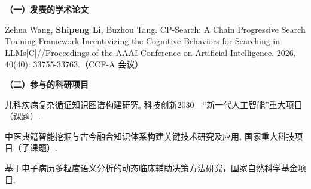 
\begin{publication}
  \noindent\songti\textbf{（一）发表的学术论文}
  \begin{publist}
    \item Zehua Wang, \textbf{Shipeng Li}, Buzhou Tang. CP-Search: A Chain Progressive Search Training Framework Incentivizing the Cognitive Behaviors for Searching in LLMs[C]//Proceedings of the AAAI Conference on Artificial Intelligence. 2026, 40(40): 33755-33763.（CCF-A 会议）
  \end{publist}

  \noindent\songti\textbf{（二）参与的科研项目}
  \begin{publist}
    \item 儿科疾病复杂循证知识图谱构建研究, 科技创新2030—“新一代人工智能”重大项目（课题）.
    \item 中医典籍智能挖掘与古今融合知识体系构建关键技术研究及应用, 国家重大科技项目（子课题）.
    \item 基于电子病历多粒度语义分析的动态临床辅助决策方法研究，国家自然科学基金项目.
  \end{publist}
\end{publication}
